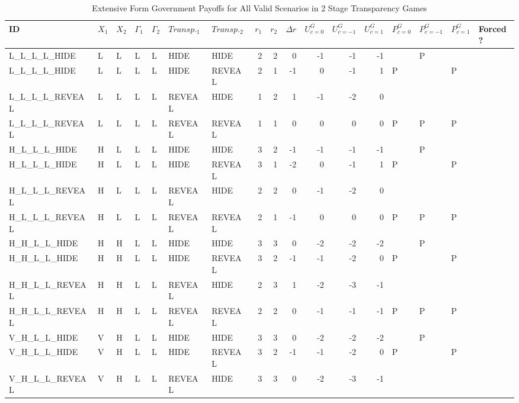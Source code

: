 \begingroup\tiny
\begin{longtable}{lllllllrrrrrrllll}
\caption{Extensive Form Government Payoffs for All Valid Scenarios in 2 Stage Transparency Games} \\ 
  \hline
ID & $X_{1}$ & $X_{2}$ & $\Gamma_{1}$ & $\Gamma_{2}$ & $Transp._{1}$ & $Transp._{2}$ & $r_{1}$ & $r_{2}$ & $\Delta r$ & $U^{G}_{c = 0}$ & $U^{G}_{c = -1}$ & $U^{G}_{c = 1}$ & $P^{G}_{c=0}$ & $P^{G}_{c = -1}$ & $P^{G}_{c = 1}$ & Forced? \\ 
  \hline
L\_L\_L\_L\_HIDE & L & L & L & L & HIDE & HIDE & 2 & 2 & 0 & -1 & -1 & -1 &  & P &  &  \\ 
  L\_L\_L\_L\_HIDE & L & L & L & L & HIDE & REVEAL & 2 & 1 & -1 & 0 & -1 & 1 & P &  & P &  \\ 
  L\_L\_L\_L\_REVEAL & L & L & L & L & REVEAL & HIDE & 1 & 2 & 1 & -1 & -2 & 0 &  &  &  &  \\ 
  L\_L\_L\_L\_REVEAL & L & L & L & L & REVEAL & REVEAL & 1 & 1 & 0 & 0 & 0 & 0 & P & P & P &  \\ 
  H\_L\_L\_L\_HIDE & H & L & L & L & HIDE & HIDE & 3 & 2 & -1 & -1 & -1 & -1 &  & P &  &  \\ 
  H\_L\_L\_L\_HIDE & H & L & L & L & HIDE & REVEAL & 3 & 1 & -2 & 0 & -1 & 1 & P &  & P &  \\ 
  H\_L\_L\_L\_REVEAL & H & L & L & L & REVEAL & HIDE & 2 & 2 & 0 & -1 & -2 & 0 &  &  &  &  \\ 
  H\_L\_L\_L\_REVEAL & H & L & L & L & REVEAL & REVEAL & 2 & 1 & -1 & 0 & 0 & 0 & P & P & P &  \\ 
  H\_H\_L\_L\_HIDE & H & H & L & L & HIDE & HIDE & 3 & 3 & 0 & -2 & -2 & -2 &  & P &  &  \\ 
  H\_H\_L\_L\_HIDE & H & H & L & L & HIDE & REVEAL & 3 & 2 & -1 & -1 & -2 & 0 & P &  & P &  \\ 
  H\_H\_L\_L\_REVEAL & H & H & L & L & REVEAL & HIDE & 2 & 3 & 1 & -2 & -3 & -1 &  &  &  &  \\ 
  H\_H\_L\_L\_REVEAL & H & H & L & L & REVEAL & REVEAL & 2 & 2 & 0 & -1 & -1 & -1 & P & P & P &  \\ 
  V\_H\_L\_L\_HIDE & V & H & L & L & HIDE & HIDE & 3 & 3 & 0 & -2 & -2 & -2 &  & P &  &  \\ 
  V\_H\_L\_L\_HIDE & V & H & L & L & HIDE & REVEAL & 3 & 2 & -1 & -1 & -2 & 0 & P &  & P &  \\ 
  V\_H\_L\_L\_REVEAL & V & H & L & L & REVEAL & HIDE & 3 & 3 & 0 & -2 & -3 & -1 &  &  &  &  \\ 

\end{longtable}
